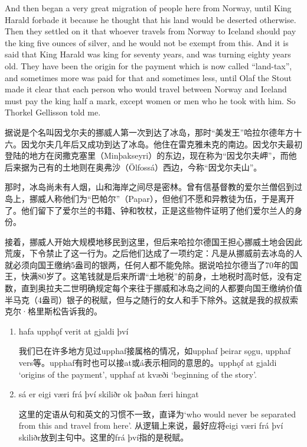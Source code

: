 \begin{paracol}{2}
    \switchcolumn
    And then began a very great migration of people here from Norway, until King Harald forbade it because he thought that his land would be deserted otherwise. Then they settled on it that whoever travels from Norway to Iceland should pay the king five ounces of silver, and he would not be exempt from this. And it is said that King Harald was king for seventy years, and was turning eighty years old. They have been the origin for the payment which is now called ``land-tax'', and sometimes more was paid for that and sometimes less, until Olaf the Stout made it clear that each person who would travel between Norway and Iceland must pay the king half a mark, except women or men who he took with him. So Thorkel Gellisson told me.
\end{paracol}
\begin{translation*}{}
    据说是个名叫因戈尔夫的挪威人第一次到达了冰岛，那时“美发王”哈拉尔德年方十六。因戈尔夫几年后又成功到达了冰岛。他住在雷克雅未克的南边。因戈尔夫最初登陆的地方在闵撒克塞里（Minþakseyri）的东边，现在称为“因戈尔夫岬”，而他后来据为己有的土地则在奥弗沙（Ölfossá）西边，今称“因戈尔夫山”。

    那时，冰岛尚未有人烟，山和海岸之间尽是密林。曾有信基督教的爱尔兰僧侣到过岛上，挪威人称他们为“巴帕尔”（Papar），但他们不愿和异教徒为伍，于是离开了。他们留下了爱尔兰的书籍、钟和牧杖，正是这些物件证明了他们爱尔兰人的身份。

    接着，挪威人开始大规模地移民到这里，但后来哈拉尔德国王担心挪威土地会因此荒废，下令禁止了这一行为。之后他们达成了一项约定：凡是从挪威前去冰岛的人就必须向国王缴纳5盎司的银两，任何人都不能免除。据说哈拉尔德当了70年的国王，快满80岁了。这笔钱就是后来所谓“土地税”的前身，土地税时高时低，没有定数，直到奥拉夫二世明确规定每个来往于挪威和冰岛之间的人都要向国王缴纳价值半马克（4盎司）银子的税赋，但与之随行的女人和手下除外。这就是我的叔叔索克尔·格里斯松告诉我的。
\end{translation*}
\begin{grammar*}{}
    \begin{enumerate}
        \item hafa upphǫf verit at gjaldi því

              我们已在许多地方见过upphaf接属格的情况，如upphaf þeirar sǫgu, upphaf vers等。upphaf有时也可以接at或á表示相同的意思的。upphǫf at gjaldi `origins of the payment', upphaf at kvæði `beginning of the story'.
        \item sá er eigi væri frá því skiliðr ok þaðan færi hingat

              这里的定语从句和英文的习惯不一致，直译为`who would never be separated from this and travel from here'. 从逻辑上来说，最好应将eigi væri frá því skiliðr放到主句中。这里的frá því指的是税赋。
    \end{enumerate}
\end{grammar*}


